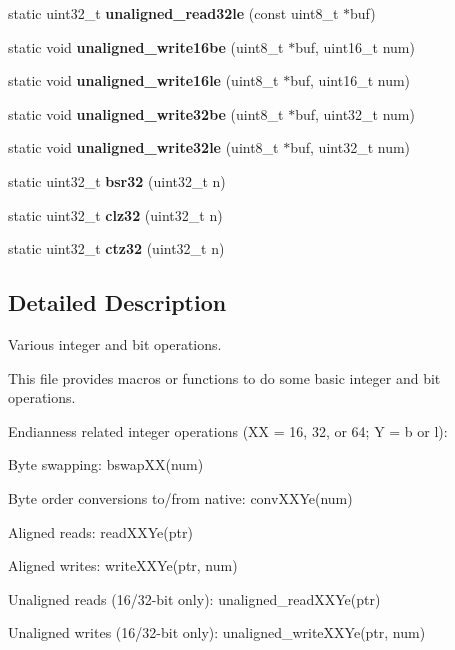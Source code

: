 \begin{DoxyCompactItemize}
\mbox{\label{tuklib__integer_8h_a29527305cc7fb6ba4b4fe8f6f44d2147}} 
static uint32\+\_\+t {\bfseries unaligned\+\_\+read32le} (const uint8\+\_\+t $\ast$buf)
\item 
\mbox{\label{tuklib__integer_8h_a822e6b949cf0f6606754e315b015421e}} 
static void {\bfseries unaligned\+\_\+write16be} (uint8\+\_\+t $\ast$buf, uint16\+\_\+t num)
\item 
\mbox{\label{tuklib__integer_8h_a36528cdd7dbf52b7c4aa438fc3c6619b}} 
static void {\bfseries unaligned\+\_\+write16le} (uint8\+\_\+t $\ast$buf, uint16\+\_\+t num)
\item 
\mbox{\label{tuklib__integer_8h_a2283faf2589131fb98468fa6a2238d5d}} 
static void {\bfseries unaligned\+\_\+write32be} (uint8\+\_\+t $\ast$buf, uint32\+\_\+t num)
\item 
\mbox{\label{tuklib__integer_8h_a80a90d3c7e8bde942b718aefc4eb6e8f}} 
static void {\bfseries unaligned\+\_\+write32le} (uint8\+\_\+t $\ast$buf, uint32\+\_\+t num)
\item 
\mbox{\label{tuklib__integer_8h_ace3a388259583931adc6cb3a2f5a8167}} 
static uint32\+\_\+t {\bfseries bsr32} (uint32\+\_\+t n)
\item 
\mbox{\label{tuklib__integer_8h_a108e65d5fe1aae56171dee1be2dcb0a4}} 
static uint32\+\_\+t {\bfseries clz32} (uint32\+\_\+t n)
\item 
\mbox{\label{tuklib__integer_8h_a80e9adeba7b4eea789a09ad5e6683d04}} 
static uint32\+\_\+t {\bfseries ctz32} (uint32\+\_\+t n)
\end{DoxyCompactItemize}


\subsection{Detailed Description}
Various integer and bit operations. 

This file provides macros or functions to do some basic integer and bit operations.

Endianness related integer operations (XX = 16, 32, or 64; Y = b or l)\+:
\begin{DoxyItemize}
\item Byte swapping\+: bswap\+X\+X(num)
\item Byte order conversions to/from native\+: conv\+X\+X\+Ye(num)
\item Aligned reads\+: read\+X\+X\+Ye(ptr)
\item Aligned writes\+: write\+X\+X\+Ye(ptr, num)
\item Unaligned reads (16/32-\/bit only)\+: unaligned\+\_\+read\+X\+X\+Ye(ptr)
\item Unaligned writes (16/32-\/bit only)\+: unaligned\+\_\+write\+X\+X\+Ye(ptr, num)
\end{DoxyItemize}

